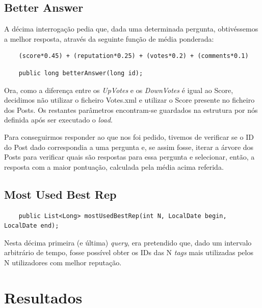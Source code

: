 \documentclass[a4paper, 11pt, oneside]{article}
\begin{document}
\subsection{Better Answer}

A décima interrogação pedia que, dada uma determinada pergunta, obtivéssemos a melhor resposta, através da seguinte função de média ponderada:

\begin{verbatim}
	(score*0.45) + (reputation*0.25) + (votes*0.2) + (comments*0.1)
\end{verbatim}

\begin{lstlisting}
	public long betterAnswer(long id);
\end{lstlisting}

Ora, como a diferença entre os \textit{UpVotes} e os \textit{DownVotes} é igual ao Score, decidimos não utilizar o ficheiro Votes.xml e utilizar o Score presente no 
ficheiro dos Posts. Os restantes parâmetros encontram-se guardados na estrutura por nós definida após ser executado o \textit{load}.

Para conseguirmos responder ao que nos foi pedido, tivemos de verificar se o ID do Post dado correspondia a uma pergunta e, se assim fosse, iterar a árvore dos Posts 
para verificar quais são respostas para essa pergunta e selecionar, então, a resposta com a maior pontuação, calculada pela média acima referida.


\subsection{Most Used Best Rep}

\begin{lstlisting}
	public List<Long> mostUsedBestRep(int N, LocalDate begin, LocalDate end);
\end{lstlisting}

Nesta décima primeira (e última) \textit{query}, era pretendido que, dado um intervalo arbitrário de tempo, fosse possível obter os IDs das N \textit{tags} mais 
utilizadas pelos N utilizadores com melhor reputação.





\section{Resultados}
\end{document}
